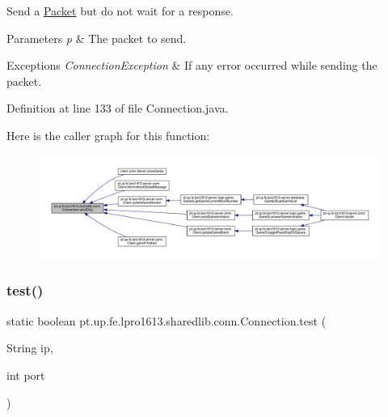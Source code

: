 Send a \hyperlink{classpt_1_1up_1_1fe_1_1lpro1613_1_1sharedlib_1_1conn_1_1_packet}{Packet} but do not wait for a response.


\begin{DoxyParams}{Parameters}
{\em p} & The packet to send. \\
\hline
\end{DoxyParams}

\begin{DoxyExceptions}{Exceptions}
{\em Connection\+Exception} & If any error occurred while sending the packet. \\
\hline
\end{DoxyExceptions}


Definition at line 133 of file Connection.\+java.

Here is the caller graph for this function\+:
\nopagebreak
\begin{figure}[H]
\begin{center}
\leavevmode
\includegraphics[width=350pt]{classpt_1_1up_1_1fe_1_1lpro1613_1_1sharedlib_1_1conn_1_1_connection_acdcf8af7c9a37ede122c6db80d06668f_icgraph}
\end{center}
\end{figure}
\hypertarget{classpt_1_1up_1_1fe_1_1lpro1613_1_1sharedlib_1_1conn_1_1_connection_a9431e4e6dd9b16f463bd75079bd8c371}{}\label{classpt_1_1up_1_1fe_1_1lpro1613_1_1sharedlib_1_1conn_1_1_connection_a9431e4e6dd9b16f463bd75079bd8c371} 
\subsubsection{\texorpdfstring{test()}{test()}}
{\footnotesize\ttfamily static boolean pt.\+up.\+fe.\+lpro1613.\+sharedlib.\+conn.\+Connection.\+test (\begin{DoxyParamCaption}\item[{String}]{ip,  }\item[{int}]{port }\end{DoxyParamCaption})\hspace{0.3cm}{\ttfamily [static]}}

